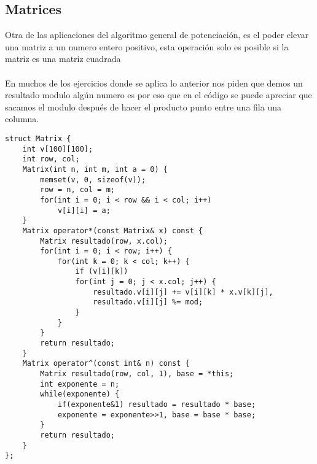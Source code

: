\subsection{Matrices}
Otra de las aplicaciones del algoritmo general de potenciación, es el poder elevar una matriz a un numero entero positivo,
esta operación solo es posible si la matriz es una matriz cuadrada
\\
\\En muchos de los ejercicios donde se aplica lo anterior nos piden que demos un resultado modulo algún numero  es por eso
que en el código se puede apreciar que sacamos el modulo después de hacer el producto punto entre una fila una columna.
\\
\begin{minipage}{\textwidth}
\begin{lstlisting}[style=C,caption=PotenciacionMatrices.cpp]
struct Matrix {
    int v[100][100];
    int row, col;
    Matrix(int n, int m, int a = 0) {
        memset(v, 0, sizeof(v));
        row = n, col = m;
        for(int i = 0; i < row && i < col; i++)
            v[i][i] = a;
    }
    Matrix operator*(const Matrix& x) const {
        Matrix resultado(row, x.col);
        for(int i = 0; i < row; i++) {
            for(int k = 0; k < col; k++) {
                if (v[i][k])
                for(int j = 0; j < x.col; j++) {
                    resultado.v[i][j] += v[i][k] * x.v[k][j],
                    resultado.v[i][j] %= mod;
                }
            }
        }
        return resultado;
    }
    Matrix operator^(const int& n) const {
        Matrix resultado(row, col, 1), base = *this;
        int exponente = n;
        while(exponente) {
            if(exponente&1)	resultado = resultado * base;
            exponente = exponente>>1, base = base * base;
        }
        return resultado;
    }
};
\end{lstlisting}
\end{minipage}

